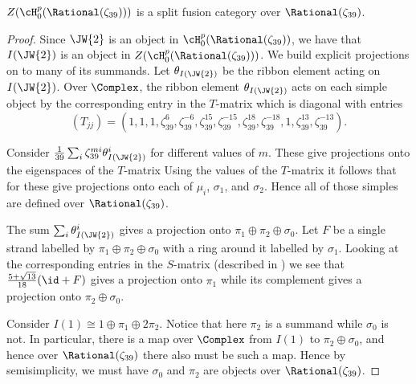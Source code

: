 \begin{thm}
$Z(\cH_0^p(\Rational(\zeta_{39})))$ is a split fusion category over $\Rational(\zeta_{39})$.
\end{thm}
\begin{proof}
Since $\JW{2}$ is an object in $\cH_0^p(\Rational(\zeta_{39}))$, we have that $I(\JW{2})$ is an object in $Z(\cH_0^p(\Rational(\zeta_{39})))$.  We build explicit projections  on to many of its summands.
Let $\theta_{I(\JW{2})}$ be the ribbon element acting on $I(\JW{2})$.  Over $\Complex$, the ribbon element $\theta_{I(\JW{2})}$ acts on each simple object by the corresponding entry in the $T$-matrix which is diagonal with entries $$(T_{jj}) = (1,1,1, \zeta_{39}^6, \zeta_{39}^{-6}, \zeta_{39}^{15},  \zeta_{39}^{-15}, \zeta_{39}^{18}, \zeta_{39}^{-18}, 1, \zeta_{39}^{13}, \zeta_{39}^{-13}).$$

Consider $\frac{1}{39}\sum_i \zeta_{39}^{m i} \theta_{I(\JW{2})}^i$ for different values of $m$. These give projections onto the eigenspaces of the $T$-matrix Using the values of the $T$-matrix it follows that for these give projections onto each of $\mu_i$, $\sigma_1$, and $\sigma_2$.  Hence all of those simples are defined over $\Rational(\zeta_{39})$.

The sum $\sum_i \theta_{I(\JW{2})}^i$ gives a projection onto $\pi_1 \oplus \pi_2 \oplus \sigma_0$.  Let $F$ be a single strand labelled by $\pi_1 \oplus \pi_2 \oplus \sigma_0$ with a ring around it labelled by $\sigma_1$.  Looking at the corresponding entries in the $S$-matrix (described in \cite{MR2468378}) we see that $\frac{5 + \sqrt{13}}{18} (\id + F)$ 
 gives a projection onto $\pi_1$ while its complement gives a projection onto $\pi_2 \oplus \sigma_0$.

Consider $I(1) \cong 1\oplus \pi_1 \oplus 2 \pi_2$.  Notice that here $\pi_2$ is a summand while $\sigma_0$ is not.  In particular, there is a map over $\Complex$ from $I(1)$ to $\pi_2 \oplus \sigma_0$, and hence over $\Rational(\zeta_{39})$ there also must be such a map.  Hence by semisimplicity, we must have $\sigma_0$ and $\pi_2$ are objects over $\Rational(\zeta_{39})$.
\end{proof}